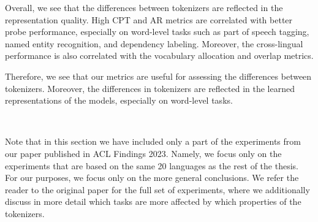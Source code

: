 Overall, we see that the differences between tokenizers are reflected in the representation quality. High CPT and AR metrics are correlated with better probe performance, especially on word-level tasks such as part of speech tagging, named entity recognition, and dependency labeling. Moreover, the cross-lingual performance is also correlated with the vocabulary allocation and overlap metrics. 

Therefore, we see that our metrics are useful for assessing the differences between tokenizers. Moreover, the differences in tokenizers are reflected in the learned representations of the models, especially on word-level tasks.

~

Note that in this section we have included only a part of the experiments from our paper \citet{limisiewicz_tokenization_2023} published in ACL Findings 2023. Namely, we focus only on the experiments that are based on the same 20 languages as the rest of the thesis. For our purposes, we focus only on the more general conclusions. We refer the reader to the original paper for the full set of experiments, where we additionally discuss in more detail which tasks are more affected by which properties of the tokenizers.







